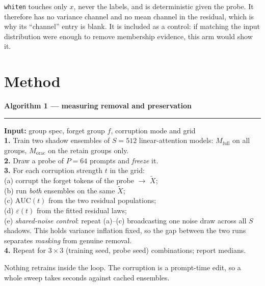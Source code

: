 \documentclass[11pt,a4paper]{article}
\newcommand{\needspacehack}{\Needspace*{12\baselineskip}}
\newcommand{\Mfull}{M_{\mathrm{full}}}
\newcommand{\Morac}{M_{\mathrm{orac}}}
\newcommand{\algtitle}[1]{\textbf{#1}\par\vspace{3pt}\hrule\vspace{5pt}}
\begin{document}
\texttt{whiten} touches only $x$, never the labels, and is deterministic given
the probe. It therefore has no variance channel and no mean channel in the
residual, which is why its ``channel'' entry is blank. It is included as a
control: if matching the input distribution were enough to remove membership
evidence, this arm would show it.

\section{Method}

\needspacehack
\begin{algbox}
\algtitle{Algorithm 1 — measuring removal and preservation}
\small
\textbf{Input:} group spec, forget group $f$, corruption mode and grid\\[3pt]
\textbf{1.} Train two shadow ensembles of $S=512$ linear-attention models:
$\Mfull$ on all groups, $\Morac$ on the retain groups only.\\
\textbf{2.} Draw a probe of $P=64$ prompts and \emph{freeze} it.\\
\textbf{3.} For each corruption strength $t$ in the grid:\\
\hspace*{1.4em}(a) corrupt the forget tokens of the probe $\to$ $\tilde X$;\\
\hspace*{1.4em}(b) run \emph{both} ensembles on the same $\tilde X$;\\
\hspace*{1.4em}(c) $\mathrm{AUC}(t)$ from the two residual populations;\\
\hspace*{1.4em}(d) $\varepsilon(t)$ from the fitted residual laws;\\
\hspace*{1.4em}(e) \emph{shared-noise control}: repeat (a)--(c) broadcasting one
noise draw across all $S$ shadows. This holds variance inflation fixed, so the
gap between the two runs separates \emph{masking} from genuine removal.\\
\textbf{4.} Repeat for $3\times3$ (training seed, probe seed) combinations;
report medians.
\end{algbox}

Nothing retrains inside the loop. The corruption is a prompt-time edit, so a
whole sweep takes seconds against cached ensembles.
\end{document}
